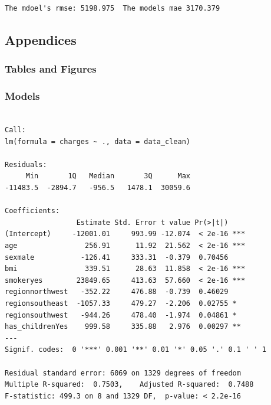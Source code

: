 \documentclass[
  letterpaper,
  DIV=11,
  numbers=noendperiod]{scrartcl}
\begin{document}
\begin{verbatim}
The mdoel's rmse: 5198.975  The models mae 3170.379
\end{verbatim}

\subsection{Appendices}\label{appendices}

\subsubsection{Tables and Figures}\label{tables-and-figures}

\subsubsection{Models}\label{models}

\begin{verbatim}

Call:
lm(formula = charges ~ ., data = data_clean)

Residuals:
     Min       1Q   Median       3Q      Max 
-11483.5  -2894.7   -956.5   1478.1  30059.6 

Coefficients:
                 Estimate Std. Error t value Pr(>|t|)    
(Intercept)     -12001.01     993.99 -12.074  < 2e-16 ***
age                256.91      11.92  21.562  < 2e-16 ***
sexmale           -126.41     333.31  -0.379  0.70456    
bmi                339.51      28.63  11.858  < 2e-16 ***
smokeryes        23849.65     413.63  57.660  < 2e-16 ***
regionnorthwest   -352.22     476.88  -0.739  0.46029    
regionsoutheast  -1057.33     479.27  -2.206  0.02755 *  
regionsouthwest   -944.26     478.40  -1.974  0.04861 *  
has_childrenYes    999.58     335.88   2.976  0.00297 ** 
---
Signif. codes:  0 '***' 0.001 '**' 0.01 '*' 0.05 '.' 0.1 ' ' 1

Residual standard error: 6069 on 1329 degrees of freedom
Multiple R-squared:  0.7503,    Adjusted R-squared:  0.7488 
F-statistic: 499.3 on 8 and 1329 DF,  p-value: < 2.2e-16
\end{verbatim}
\end{document}

